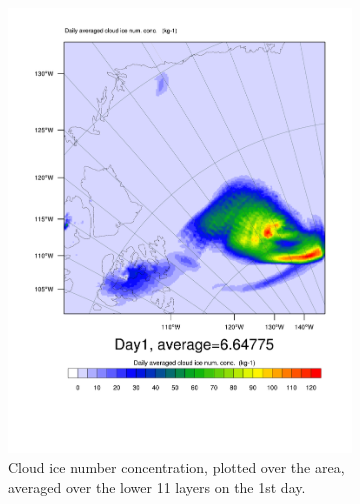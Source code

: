 \begin{figure}
	\begin{subfigure}{0.48\textwidth}
		\centering
		\includegraphics[width=\textwidth]{results/control/QNICE_day1.pdf}
		\caption{Cloud ice number concentration, plotted over the area, averaged over the lower 11 layers on the 1st day.}
		\label{subfig:cinc_cont_Day1}
	\end{subfigure}
	\begin{subfigure}{0.48\textwidth}
		\centering

\end{subfigure}
\end{figure}
